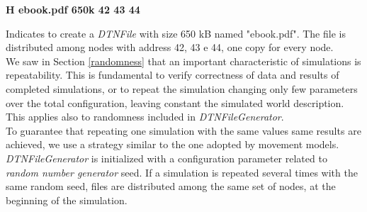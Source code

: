 \begin{center}
\textbf{H	ebook.pdf	650k	42	43	44}
\end{center}
Indicates to create a \textit{DTNFile} with size 650 kB named "ebook.pdf". The file is distributed among nodes with address 42, 43 e 44, one copy for every node.
\\

We saw in Section \ref{randomness} that an important characteristic of simulations is repeatability. This is fundamental to verify correctness of data and results of completed simulations, or to repeat the simulation changing only few parameters over the total configuration, leaving constant the simulated world description. This applies also to randomness included in \textit{DTNFileGenerator}.\\
To guarantee that repeating one simulation with the same values same results are achieved, we use a strategy similar to the one adopted by movement models. \textit{DTNFileGenerator} is initialized with a configuration parameter related to \textit{random number generator} seed. If a simulation is repeated several times with the same random seed, files are distributed among the same set of nodes, at the beginning of the simulation.




